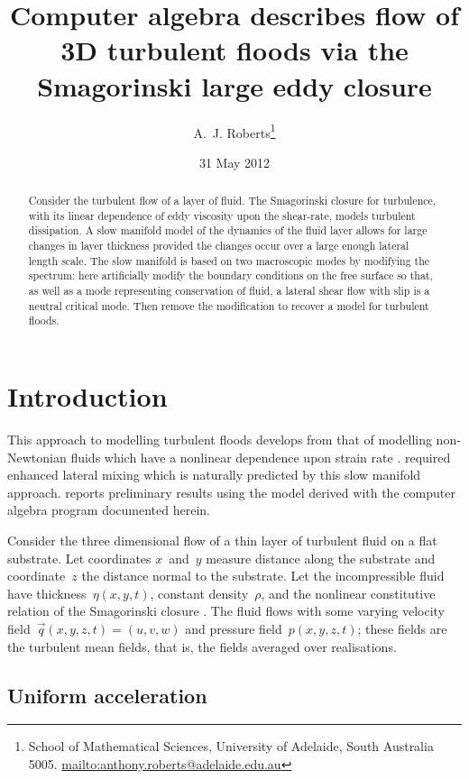 \documentclass[12pt,a5paper]{article}
\title{Computer algebra describes flow of 3D turbulent floods via the Smagorinski large eddy closure}
\author{A.~J. Roberts\thanks{School of Mathematical Sciences,
University of Adelaide, South Australia 5005.  \protect\url{mailto:anthony.roberts@adelaide.edu.au}}}
\date{31 May 2012}
\begin{document}
    
\maketitle
    
\begin{abstract}
Consider the turbulent flow of a layer of fluid.  The Smagorinski closure for turbulence, with its linear dependence of eddy viscosity upon the shear-rate, models turbulent dissipation.  A slow manifold model of the dynamics of the fluid layer allows for large changes in layer thickness provided the changes occur over a large enough lateral length scale.  The slow manifold is based on two macroscopic modes by modifying the spectrum: here artificially modify the boundary conditions on the free surface so that, as well as a mode representing conservation of fluid, a lateral shear flow with slip is a neutral critical mode.  Then remove the modification to recover a model for turbulent floods. \end{abstract}

\tableofcontents




\section{Introduction}

This approach to modelling turbulent floods develops from that of modelling non-Newtonian fluids which have a nonlinear dependence upon strain rate \cite[]{Roberts07a, Roberts07b}. \cite{Bijvelds99} required enhanced lateral mixing which is naturally predicted by this slow manifold approach. \cite{Roberts08f} reports preliminary results using the model derived with the computer algebra program documented herein.

Consider the three dimensional flow of a thin layer of turbulent fluid on a flat substrate.  Let coordinates $x$~and~$y$ measure distance along the substrate and coordinate~$z$ the distance normal to the substrate.  Let the incompressible fluid have thickness~$\eta(x,y,t)$, constant density~$\rho$, and the nonlinear constitutive relation of the Smagorinski closure \cite[e.g.]{Kim02, Marstop06, Ozgokmen07}.  The fluid flows with some varying velocity field~$\vec q(x,y,z,t)=(u,v,w)$ and pressure field~$p(x,y,z,t)$; these fields are the turbulent mean fields, that is, the fields averaged over realisations.

\subsection{Uniform acceleration}
\end{document}
